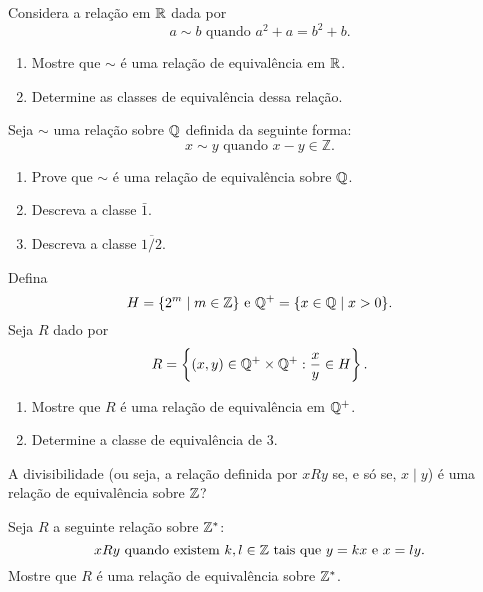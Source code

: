 \documentclass[12pt]{exam}
\begin{document}
    \questao{} Considera a rela\c{c}\~ao em $\mathbb{R}$ dada por
    \[
        a \sim b \mbox{ quando } a^2 + a = b^2 + b.
    \]
    \begin{enumerate}[label={\alph*})]
        \item Mostre que $\sim$ \'e uma rela\c{c}\~ao de equival\^encia em $\mathbb{R}$.
        \item Determine as classes de equival\^encia dessa rela\c{c}\~ao.
    \end{enumerate}

    \vspace{.3cm}

    \questao{} Seja $\sim$ uma rela{\c c}{\~a}o sobre $\mathbb{Q}$ definida da seguinte forma:
    \[
        x \sim y \mbox{ quando } x - y \in \mathbb{Z}.
    \]
    \begin{enumerate}[label={\alph*})]
        \item Prove que $\sim$ {\'e} uma rela{\c c}{\~a}o de equival{\^e}ncia sobre $\mathbb{Q}$.
        \item Descreva a classe $\bar{1}$.
        \item Descreva a classe $\overline{1/2}$.
    \end{enumerate}

    \vspace{.3cm}

    \questao{} Defina
    \[
        H = \{2^m \mid m \in \mathbb{Z}\} \mbox{ e } \mathbb{Q}^+ = \{x \in \mathbb{Q} \mid x > 0\}.
    \]
    Seja $R$ dado por
    \[
        R = \left\{(x,y) \in \mathbb{Q}^+\times \mathbb{Q}^+ : \frac{x}{y} \in H\right\}.
    \]
    \begin{enumerate}[label={\alph*})]
        \item Mostre que $R$ \'e uma rela\c{c}\~ao de equival\^encia em $\mathbb{Q}^+$.
        \item Determine a classe de equival\^encia de $3$.
    \end{enumerate}
    \vspace{.3cm}

    \questao{} A divisibilidade (ou seja, a rela{\c c}{\~a}o definida por $xRy$ se, e s{\'o}
    se, $x \mid y$) {\'e} uma rela{\c c}{\~a}o de equival{\^e}ncia sobre $\mathbb{Z}$?

    \vspace{.3cm}

    \questao{} Seja $R$ a seguinte rela{\c c}{\~a}o sobre $\mathbb{Z}^*$:
    \[
        x R y \mbox{ quando existem }  k, l \in \mathbb{Z} \mbox{ tais que } y = kx \mbox{ e } x = ly.
    \]
    Mostre que $R$ {\'e} uma rela{\c c}{\~a}o de equival{\^e}ncia sobre $\mathbb{Z}^*$.
\end{document}
